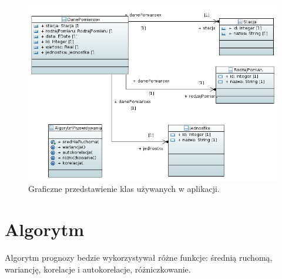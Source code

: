 \documentclass[11pt, a4paper, oneside]{mwart}
\begin{document}
\begin{figure}[htbp]
  \centering
  \includegraphics[width=\textwidth]{./uml}
  \caption{Graficzne przedstawienie klas używanych w aplikacji.}
  \label{fig:diagram_uml}
\end{figure}

\section{Algorytm}

Algorytm prognozy bedzie wykorzystywał różne funkcje: średnią ruchomą, wariancję, korelacje i autokorelacje, różniczkowanie.
\end{document}
